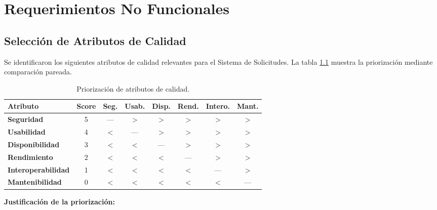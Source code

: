 \chapter{Requerimientos No Funcionales}

\section{Selección de Atributos de Calidad}

Se identificaron los siguientes atributos de calidad relevantes para el Sistema de Solicitudes. La tabla \ref{tab:priorización} muestra la priorización mediante comparación pareada.

\begin{table}[H]
\centering
\caption{Priorización de atributos de calidad.}
\label{tab:priorización}
\small
\begin{tabular}{|l|c|c|c|c|c|c|c|}
    \hline
    \textbf{Atributo} & \textbf{Score} & \textbf{Seg.} & \textbf{Usab.} & \textbf{Disp.} & \textbf{Rend.} & \textbf{Intero.} & \textbf{Mant.} \\
    \hline
    \textbf{Seguridad} & 5 & --- & $>$ & $>$ & $>$ & $>$ & $>$ \\
    \hline
    \textbf{Usabilidad} & 4 & $<$ & --- & $>$ & $>$ & $>$ & $>$ \\
    \hline
    \textbf{Disponibilidad} & 3 & $<$ & $<$ & --- & $>$ & $>$ & $>$ \\
    \hline
    \textbf{Rendimiento} & 2 & $<$ & $<$ & $<$ & --- & $>$ & $>$ \\
    \hline
    \textbf{Interoperabilidad} & 1 & $<$ & $<$ & $<$ & $<$ & --- & $>$ \\
    \hline
    \textbf{Mantenibilidad} & 0 & $<$ & $<$ & $<$ & $<$ & $<$ & --- \\
    \hline
\end{tabular}
\end{table}

\textbf{Justificación de la priorización:}

